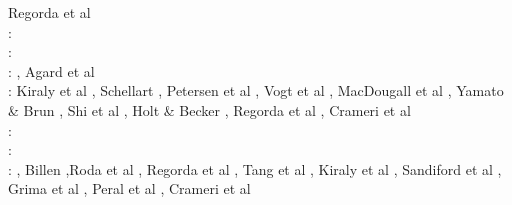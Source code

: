 \begin{scriptsize}
\cite{namu13}\cite{yosh13}\cite{zhgt13}\cite{lixg13} 
\cite{jabr13}\cite{izht13}\cite{luws13}\cite{dusc13}\cite{tibb13}\cite{bubj13}\cite{scmo13} 
\cite{fuob13}\cite{magc13}\cite{musi13}\cite{mibg13}\cite{grpy13}\cite{vagd13a}\cite{vagd13b}
\cite{cavg13}\cite{vocg13}\cite{qula13}\cite{bugu13}\cite{myhi13}\cite{mesc13}\cite{cibi13}
\cite{scra13} Regorda et al \cite{rems13}\\
\twothousandfourteen: 
\cite{robn14}\cite{hond14}\cite{ronc14}\cite{mobm14}\cite{famc14}\cite{fogm14}\cite{frba14} 
\cite{gagd14}\cite{voge14}\cite{voge14b}\cite{lidr14}\cite{bocj04}\cite{bagb14}\cite{stjm14}
\cite{basc14}\cite{vamd14}\cite{kile14}\cite{jahm14}\cite{bufa14}\cite{bufy14b}\cite{chsv14}
\cite{chsg14}\cite{sigb14}\cite{shjm14}\cite{mova14}\cite{olpr14}\cite{paml14b}\cite{mafv14}\\
\twothousandfifteen: 
\cite{bemm15}\cite{bomv15}\cite{bogf15}\cite{ceag15}\cite{kifr15}\cite{vami15}\cite{dali15}
\cite{mami15}\cite{rula15}\cite{chsd15}\cite{dusc15}\cite{yotr15}\cite{cibi15}\cite{hobb15}
\cite{carr15}\\
\twothousandsixteen: 
\cite{tomy16}\cite{gukt16}\cite{robn16}\cite{mavm16}\cite{magc16}\cite{marl16}\cite{mesj16}
\cite{jada16}\cite{jada16b}\cite{liku16}\cite{chss16}, Agard et al \cite{agys16}\\
\twothousandseventeen: 
Kiraly et al \cite{kicf17}, Schellart \cite{sche17}, Petersen et al \cite{pest17},
Vogt et al \cite{vomc17}, MacDougall et al \cite{majf17}, Yamato \& Brun \cite{yabr17}, 
Shi et al \cite{shwl17}, Holt \& Becker \cite{hobe17}, Regorda et al \cite{rerm17},
Crameri et al \cite{crlt17}\\
\twothousandeighteen: 
\cite{yamz18}\cite{crli18}\cite{spcv18}\cite{chss18}\cite{yagz18}\cite{mazh18}\cite{pukp18}
\cite{masg18}\cite{biar18}\\
\twothousandnineteen:
\cite{magn19}\cite{mavb19}\cite{scvm19}\cite{cakc19}\cite{samo19}\cite{sihf19}\cite{meag19}
\cite{vaws19}\cite{bokg19}\cite{vawg19}\cite{cibi19}\cite{pust19}\\
\twothousandtwenty:
\cite{algg20}\cite{braf20}\cite{vamg20}\cite{dawl20}\cite{meag20}\cite{bedh20}\cite{heyg20}
\cite{kicd20}\cite{mugu20}\cite{gatt20}\cite{pust20}, Billen \cite{bill20},Roda et al \cite{rozr20}, Regorda et al \cite{relr20}, Tang et al \cite{tacm20}, Kiraly et al \cite{kiph20}, Sandiford et al \cite{sams20}, Grima et al \cite{grlc20}, Peral et al \cite{perz20}, Crameri et al \cite{crmd20}
\end{scriptsize}

